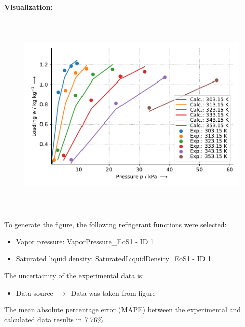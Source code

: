 \textbf{Visualization:}
%
\begin{figure}[!htp]
{\noindent\includegraphics[height=10cm, keepaspectratio]{figs/ads/ads_Ethanol_activated_carbon_powder_H2-treated_Maxsorb_III_DubininAstakhov_1.pdf}}
\end{figure}
%

To generate the figure, the following refrigerant functions were selected:
\begin{itemize}
\item Vapor pressure: VaporPressure\_EoS1 - ID 1
\item Saturated liquid density: SaturatedLiquidDensity\_EoS1 - ID 1
\end{itemize}

The uncertainity of the experimental data is:
\begin{itemize}
\item Data source $\,\to\,$ Data was taken from figure
\end{itemize}

The mean absolute percentage error (MAPE) between the experimental and calculated data results in 7.76\%.
\FloatBarrier
\newpage
